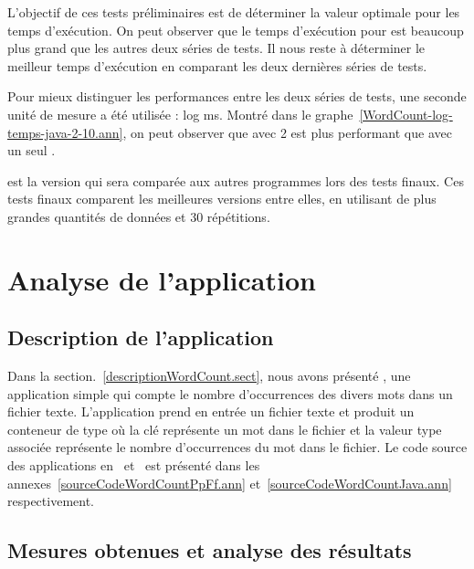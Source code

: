 L'objectif de ces tests pr\'eliminaires est de d\'eterminer la valeur optimale pour les temps d'ex\'ecution. On peut observer que le temps d'ex\'ecution pour  est beaucoup plus grand que les autres deux s\'eries de tests. Il nous reste \`a d\'eterminer le meilleur temps d'ex\'ecution en comparant les deux derni\`eres s\'eries de tests.

Pour mieux distinguer les performances entre les deux s\'eries de tests, une seconde unit\'e de mesure a \'et\'e utilis\'ee : log ms. Montr\'e dans le graphe~\ref{WordCount-log-temps-java-2-10.ann}, on peut observer que  avec 2  est plus performant que  avec un seul . 

 est la version qui sera compar\'ee aux autres programmes lors des tests finaux. Ces tests finaux comparent les meilleures versions entre elles, en utilisant de plus grandes quantit\'es de donn\'ees et 30 r\'ep\'etitions.


\section{Analyse de l'application }
\label{wordcount.sect}



\subsection{Description de l'application }


Dans la section.~\ref{descriptionWordCount.sect}, nous avons pr\'esent\'e , une application simple qui compte le nombre d'occurrences des divers mots dans un fichier texte. L'application prend en entr\'ee un fichier texte et produit un conteneur de type  où la cl\'e repr\'esente un mot dans le fichier et la valeur  type   associ\'ee repr\'esente le nombre d'occurrences du mot dans le fichier. Le code source des applications  en~ et~ est pr\'esent\'e dans les annexes~\ref{sourceCodeWordCountPpFf.ann} et~\ref{sourceCodeWordCountJava.ann} respectivement.


\subsection{Mesures obtenues et analyse des r\'esultats}


